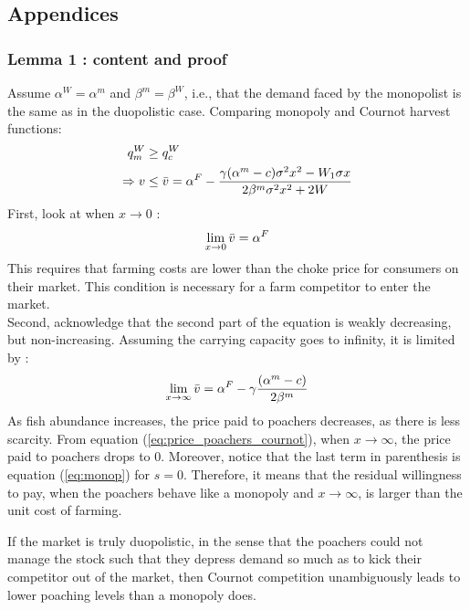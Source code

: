 \subsection{Appendices}
\label{subsection:appendix_toto}
\subsubsection{Lemma 1 : content and proof}
\label{section:AppendixB}

Assume $\alpha^W = \alpha^m$ and $\beta^m  =\beta^W$, i.e., that the demand faced by the monopolist is the same as in the duopolistic case.  Comparing monopoly and Cournot harvest functions:
\begin{align*}
q^W_m &\geq q^W_c\\
    \Rightarrow v & \leq \Bar{v}=\alpha^F - \frac{\gamma(\alpha^m - c)\sigma^2x^2 - W_1\sigma x}{2\beta^m\sigma^2x^2 + 2W}
\end{align*}
First, look at when $x \to 0$ : 
$$
\lim_{x\to 0}\Bar{v} = \alpha^F
$$
This requires that farming costs are lower than the choke price for consumers on their market. This condition is necessary for a farm competitor to enter the market. 
\\
Second, acknowledge that the second part of the equation is weakly decreasing, but non-increasing. Assuming the carrying capacity goes to infinity, it is limited by :
$$
\lim_{x \to \infty}\Bar{v} = \alpha^F - \gamma\frac{(\alpha^m - c)}{2\beta^m}
$$
As fish abundance increases, the price paid to poachers decreases, as there is less scarcity. From equation (\ref{eq:price_poachers_cournot}), when $x \to \infty$, the price paid to poachers drops to 0. 
Moreover, notice that the last term in parenthesis is equation (\ref{eq:monop}) for $s=0$. Therefore, it means that the residual willingness to pay, when the poachers behave like a monopoly and $x\to \infty$, is larger than the unit cost of farming. 

If the market is truly duopolistic, in the sense that the poachers could not manage the stock such that they depress demand so much as to kick their competitor out of the market, then Cournot competition unambiguously leads to lower poaching levels than a monopoly does.
%
